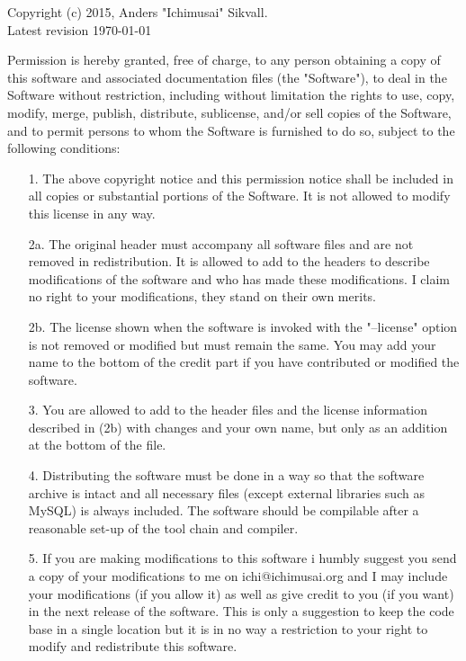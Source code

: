 \documentclass[english,twoside,openright,a4paper,12pt]{article}
\begin{document}
Copyright (c) 2015, Anders "Ichimusai" Sikvall.\\
Latest revision \today
 
Permission is hereby granted, free of charge, to any person obtaining
a copy of this software and associated documentation files (the
"Software"), to deal in the Software without restriction, including
without limitation the rights to use, copy, modify, merge, publish,
distribute, sublicense, and/or sell copies of the Software, and to
permit persons to whom the Software is furnished to do so, subject to
the following conditions:


\begin{itemize}
\item[1.] The above copyright notice and this permission notice shall
  be included in all copies or substantial portions of the Software.
  It is not allowed to modify this license in any way.
  
\item[2a.] The original header must accompany all software files and
  are not removed in redistribution. It is allowed to add to the
  headers to describe modifications of the software and who has made
  these modifications. I claim no right to your modifications, they
  stand on their own merits.
 
\item[2b.] The license shown when the software is invoked with the
  "--license" option is not removed or modified but must remain the
  same. You may add your name to the bottom of the credit part if you
  have contributed or modified the software.
 
\item[3.] You are allowed to add to the header files and the license
  information described in (2b) with changes and your own name, but
  only as an addition at the bottom of the file.
 
\item[4.] Distributing the software must be done in a way so that the
  software archive is intact and all necessary files (except external
  libraries such as MySQL) is always included. The software should be
  compilable after a reasonable set-up of the tool chain and compiler.
 
\item[5.] If you are making modifications to this software i humbly
  suggest you send a copy of your modifications to me on
  ichi@ichimusai.org and I may include your modifications (if you
  allow it) as well as give credit to you (if you want) in the next
  release of the software. This is only a suggestion to keep the code
  base in a single location but it is in no way a restriction to your
  right to modify and redistribute this software.

\end{itemize}
\end{document}
